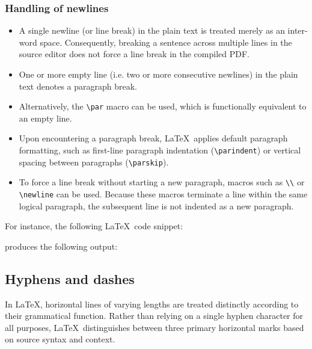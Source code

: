 		\subsubsection{Handling of newlines}
			\begin{itemize}
				\item A single newline (or line break) in the plain text is treated merely as an inter-word space. Consequently, breaking a sentence across multiple lines in the source editor does not force a line break in the compiled PDF.
				\item One or more empty line (i.e. two or more consecutive newlines) in the plain text denotes a paragraph break.
				\item Alternatively, the \lstinline|\par| macro can be used, which is functionally equivalent to an empty line.
				\item Upon encountering a paragraph break, \LaTeX\ applies default paragraph formatting, such as first-line paragraph indentation (\lstinline|\parindent|) or vertical spacing between paragraphs (\lstinline|\parskip|).
				\item To force a line break without starting a new paragraph, macros such as \lstinline|\\| or \lstinline|\newline| can be used. Because these macros terminate a line within the same logical paragraph, the subsequent line is not indented as a new paragraph.
			\end{itemize}
			
			For instance, the following \LaTeX\ code snippet:

			produces the following output:
	
	\subsection{Hyphens and dashes}
		In \LaTeX, horizontal lines of varying lengths are treated distinctly according to their grammatical function. Rather than relying on a single hyphen character for all purposes, \LaTeX\ distinguishes between three primary horizontal marks based on source syntax and context.
		
